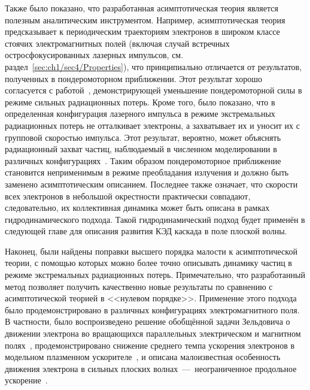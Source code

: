 Также было показано, что разработанная асимптотическая теория является полезным аналитическим инструментом.
Например, асимптотическая теория предсказывает к периодическим траекториям электронов в широком классе стоячих электромагнитных полей (включая случай встречных остросфокусированных лазерных импульсов, см. раздел~\ref{sec:ch1/sec4/Properties}), что принципиально отличается от результатов, полученных в пондеромоторном приближении.
Этот результат хорошо согласуется с работой~\cite{Fedotov14b}, демонстрирующей уменьшение пондеромоторной силы в режиме сильных радиационных потерь.
Кроме того, было показано, что в определенная конфигурация лазерного импульса в режиме экстремальных радиационных потерь не отталкивает электроны, а захватывает их и уносит их с групповой скоростью импульса.
Этот результат, вероятно, может объяснять радиационный захват частиц, наблюдаемый в численном моделировании в различных конфигурациях~\cite{Gonoskov14, Ji14b, zhu2015enhanced, kirk2016radiative, vranic2018extremely, gong2019radiation}.
Таким образом пондеромоторное приближение становится неприменимым в режиме преобладания излучения и должно быть заменено асимптотическим описанием.
Последнее также означает, что скорости всех электронов в небольшой окрестности практически совпадают, следовательно, их коллективная динамика может быть описана в рамках гидродинамического подхода.
Такой гидродинамический подход будет применён в следующей главе для описания развития КЭД каскада в поле плоской волны. 

Наконец, были найдены поправки высшего порядка малости к асимптотической теории, с помощью которых можно более точно описывать динамику частиц в режиме экстремальных радиационных потерь.
Примечательно, что разработанный метод позволяет получить качественно новые результаты по сравнению с асимптотической теорией в <<нулевом порядке>>.
Применение этого подхода было продемонстрировано в различных конфигурациях электромагнитного поля.
В частности, было воспроизведено решение обобщённой задачи Зельдовича о движении электрона во вращающихся параллельных электрическом и магнитном полях~\cite{Zeldovich75, Kostyukov2016}, продемонстрировано снижение среднего темпа ускорения электронов в модельном плазменном ускорителе~\cite{kostyukov2012radiative, golovanov2021radiation}, и описана малоизвестная особенность движения электрона в сильных плоских волнах~---~неограниченное продольное ускорение~\cite{gunn1971motion, grewing1973acceleration, thielheim1993particle,di2008exact,ekman2021exact}.

